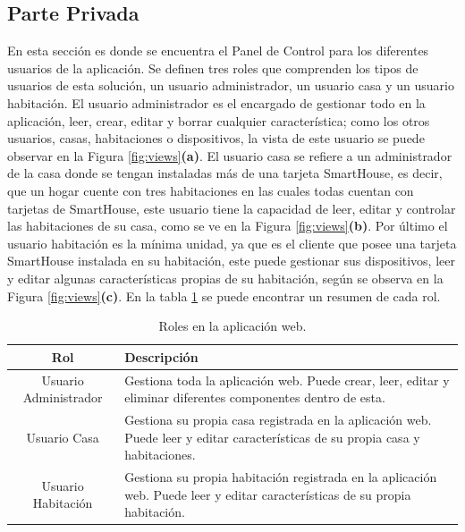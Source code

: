 \subsection{Parte Privada}

En esta sección es donde se encuentra el Panel de Control para los diferentes usuarios de la aplicación. Se definen tres roles que comprenden los tipos de usuarios de esta solución, un usuario administrador, un usuario casa y un usuario habitación. El usuario administrador es el encargado de gestionar todo en la aplicación, leer, crear, editar y borrar cualquier característica; como los otros usuarios, casas, habitaciones o dispositivos, la vista de este usuario se puede observar en la Figura \ref{fig:views}\textbf{(a)}. El usuario casa se refiere a un administrador de la casa donde se tengan instaladas más de una tarjeta SmartHouse, es decir, que un hogar cuente con tres habitaciones en las cuales todas cuentan con tarjetas de SmartHouse, este usuario tiene la capacidad de leer, editar y controlar las habitaciones de su casa, como se ve en la Figura \ref{fig:views}\textbf{(b)}. Por último el usuario habitación es la mínima unidad, ya que es el cliente que posee una tarjeta SmartHouse instalada en su habitación, este puede gestionar sus dispositivos, leer y editar algunas características propias de su habitación, según se observa en la Figura \ref{fig:views}\textbf{(c)}. En la tabla \ref{table:roles} se puede encontrar un resumen de cada rol.\\

\begin{table}[H]
	\begin{center}
		\caption{Roles en la aplicación web.}
		\label{table:roles}
		\begin{tabular}{|c|p{9cm}|}
			\hline 
			\textbf{Rol} & \textbf{Descripción} \\ 
			\hline 
			Usuario Administrador & Gestiona toda la aplicación web. Puede crear, leer, editar y eliminar diferentes componentes dentro de esta.\\ 
			\hline 
			Usuario Casa & Gestiona su propia casa registrada en la aplicación web. Puede leer y editar características de su propia casa y habitaciones.\\ 
			\hline 
			Usuario Habitación & Gestiona su propia habitación registrada en la aplicación web. Puede leer y editar características de su propia habitación.\\ 
			\hline 
		\end{tabular} 
	\end{center}
\end{table}

